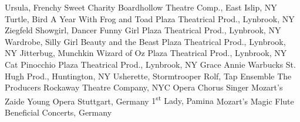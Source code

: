 \begin{cventries}
  \cventrytabb %
    {Ursula, Frenchy}%
    {Sweet Charity}%
    {Boardhollow Theatre Comp., East Islip, NY}%
    {} %
  \cventrytabb %
    {Turtle, Bird}%
    {A Year With Frog and Toad}%
    {Plaza Theatrical Prod., Lynbrook, NY}%
    {} %
  \cventrytabb %
    {Ziegfeld Showgirl, Dancer}%
    {Funny Girl}%
    {Plaza Theatrical Prod., Lynbrook, NY}%
    {} %
  \cventrytab %
    {Wardrobe, Silly Girl}%
    {Beauty and the Beast}%
    {Plaza Theatrical Prod., Lynbrook, NY}%
    {} %
  \cventrytab %
    {Jitterbug, Munchkin}%
    {Wizard of Oz}%
    {Plaza Theatrical Prod., Lynbrook, NY}%
    {} %
  \cventrytab %
    {Cat}%
    {Pinocchio}%
    {Plaza Theatrical Prod., Lynbrook, NY}%
    {} %
  \cventrytab %
    {Grace}%
    {Annie Warbucks}%
    {St. Hugh Prod., Huntington, NY}%
    {} %
  \cventrytab 
    {Usherette, Stormtrooper Rolf, Tap Ensemble}%
    {The Producers}%
    {Rockaway Theatre Company, NYC}%
    {} %
  \cventrytab
    {Opera Chorus Singer}%
    {Mozart's Zaide}%
    {Young Opera Stuttgart, Germany}%
    {}
  \cventrytab
    {1\textsuperscript{st} Lady, Pamina}
    {Mozart's Magic Flute}
    {Beneficial Concerts, Germany}
    {}
\end{cventries}